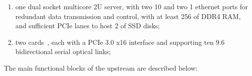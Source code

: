 \begin{enumerate}
\item one dual socket multicore 2U server, with two \SI{10}{\Gbps} and two \SI{1}{\Gbps} ethernet ports for redundant data transmission and control, with at least \SI{256}{\GB} of DDR4 RAM, and sufficient PCIe lanes to host \SI{2}{\TB} of SSD disks;
\item two  cards~\cite{atlas-felix}, each with a PCIe 3.0 x16 interface and supporting ten \SI{9.6}{\Gbps} bidirectional serial optical links;

\end{enumerate}


The main functional blocks of the upstream  are described below:

